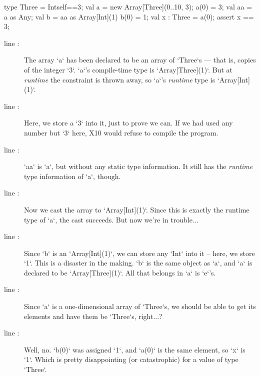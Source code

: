 \begin{xtennum}[]
type Three = Int{self==3};
val a = new Array[Three](0..10, 3);
a(0) = 3; 
val aa = a as Any; 
val b = aa as Array[Int](1) 
b(0) = 1; 
val x : Three = a(0); 
assert x == 3; 
\end{xtennum}

\begin{description}

\item [line :] The array \xcd`a` has been declared to be
      an array of \xcd`Three`s --- that is, copies of the integer \xcd`3`.
      \xcd`a`'s compile-time type is \xcd`Array[Three](1)`.  But at {\em
      runtime} the constraint is thrown away, so \xcd`a`'s {\em runtime} type
      is \xcd`Array[Int](1)`. 

\item [line :] 
      Here, we store a \xcd`3` into it, just to prove we can.  If we had used
      any number but \xcd`3` here, X10 would refuse to compile the program.

\item [line :] \xcd`aa` is \xcd`a`, but without any
      static type information.  It still has the {\em runtime} type
      information of \xcd`a`, though.

\item [line :] Now we cast the array to \xcd`Array[Int](1)`.
      Since this is exactly the runtime type of \xcd`a`, the cast succeeds.
      But now we're in trouble...

\item [line :] Since \xcd`b` is an \xcd`Array[Int](1)`,
      we can store any \xcd`Int` into it -- here, we store \xcd`1`.  This is a
      disaster in the making. \xcd`b` is the same object as \xcd`a`, and
      \xcd`a` is declared to be \xcd`Array[Three](1)`. All that belongs in
      \xcd`a` is \xcd`e`'s. 

\item [line :] Since \xcd`a` is a
      one-dimensional array of \xcd`Three`s, we should be able to get its
      elements and have them be \xcd`Three`s, right...?  

\item [line :] Well, no.  \xcd`b(0)` was assigned
      \xcd`1`, and \xcd`a(0)` is the same element, so \xcd`x` is \xcd`1`.
      Which is pretty disappointing (or catastrophic) for a value of type
      \xcd`Three`. 
\end{description}


